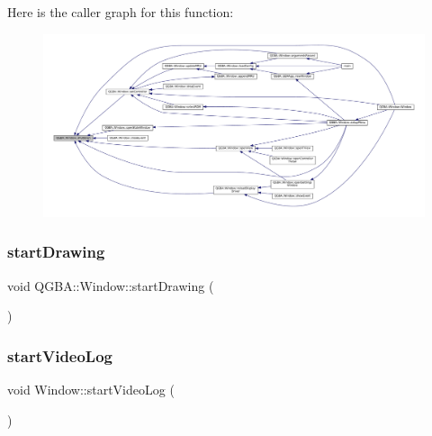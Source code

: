 Here is the caller graph for this function\+:
\nopagebreak
\begin{figure}[H]
\begin{center}
\leavevmode
\includegraphics[width=350pt]{class_q_g_b_a_1_1_window_a76ef9d12e6314062232114b5c1f0fa82_icgraph}
\end{center}
\end{figure}
\mbox{\label{class_q_g_b_a_1_1_window_a14f748045877e64df2193fede906a951}} 
\subsubsection{\texorpdfstring{start\+Drawing}{startDrawing}}
{\footnotesize\ttfamily void Q\+G\+B\+A\+::\+Window\+::start\+Drawing (\begin{DoxyParamCaption}{ }\end{DoxyParamCaption})\hspace{0.3cm}{\ttfamily [signal]}}

\mbox{\label{class_q_g_b_a_1_1_window_a5cb56389e381fc24d6243cbd0a628aa1}} 
\subsubsection{\texorpdfstring{start\+Video\+Log}{startVideoLog}}
{\footnotesize\ttfamily void Window\+::start\+Video\+Log (\begin{DoxyParamCaption}{ }\end{DoxyParamCaption})\hspace{0.3cm}{\ttfamily [slot]}}

